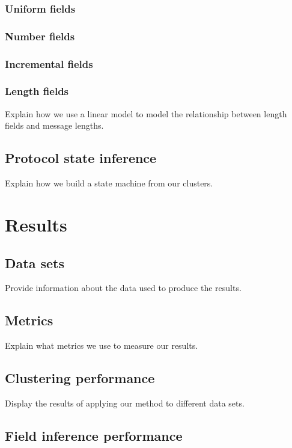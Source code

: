 \documentclass[a4paper]{report}
\begin{document}
\subsection{Uniform fields}

\subsection{Number fields}

\subsection{Incremental fields}

\subsection{Length fields}
Explain how we use a linear model to model the relationship between length
fields and message lengths.

\section{Protocol state inference}
Explain how we build a state machine from our clusters.

\chapter{Results}

\section{Data sets}
Provide information about the data used to produce the results.

\section{Metrics}
Explain what metrics we use to measure our results.

\section{Clustering performance}
Display the results of applying our method to different data sets.

\section{Field inference performance}
\end{document}
